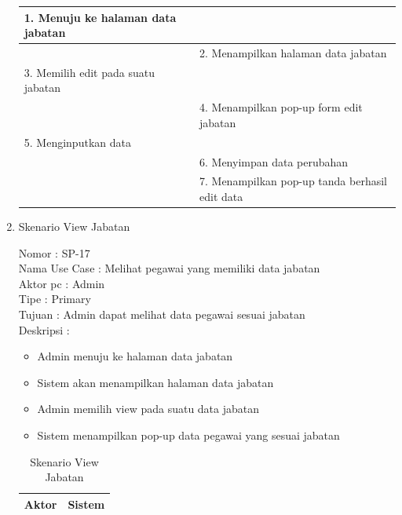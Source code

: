 \begin{enumerate}
\begin{table}
\begin{tabular}{ | p{58mm} | p{70mm} |}
		1.	Menuju ke halaman data jabatan &  \\
		
		\hline
		
		&  2.	Menampilkan halaman data jabatan \\
		
		\hline
		
		3. Memilih edit pada suatu jabatan & \\
		
		\hline
		
		& 4.	Menampilkan pop-up form edit jabatan \\
		
		\hline
		
		5.	Menginputkan data  & \\
		\hline
		
		& 6.	Menyimpan data perubahan \\
		\hline
		
		& 7.	Menampilkan pop-up tanda berhasil edit data \\
		\hline
		
	\end{tabular}
\end{table}

\item Skenario View Jabatan

Nomor \kern 3.6pc : SP-17 \\
Nama Use Case : Melihat pegawai yang memiliki data jabatan \\
Aktor  pc : Admin \\
Tipe \kern 4.6pc : Primary \\
Tujuan \kern 3.6pc : Admin dapat melihat data pegawai sesuai jabatan \\
Deskripsi \kern 2.5pc : 

\begin{itemize}
	\item Admin menuju ke halaman data jabatan
	\item Sistem akan menampilkan halaman data jabatan
	\item Admin memilih view pada suatu data jabatan
	\item Sistem menampilkan pop-up data pegawai yang sesuai jabatan
	
\end{itemize}

\begin{table}
	\caption{Skenario View Jabatan}
	\centering
	\begin{tabular}{ | p{59mm} | p{69mm}|}
		\hline 
		\textbf{Aktor} & \textbf{Sistem} \\
		\hline
		

\end{tabular}
\end{table}
\end{enumerate}
